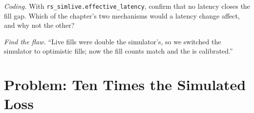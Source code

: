 \begin{exercise}[$\star\star\star$]\label{exo:rs:simulation-versus-live:7}
\emph{Coding.} With \texttt{rs\_simlive.effective\_latency}, confirm that no latency closes the fill gap. Which of the chapter's two mechanisms would a latency change
affect, and why not the other?
\end{exercise}

\begin{exercise}[$\star\star\star$]\label{exo:rs:simulation-versus-live:8}
\emph{Find the flaw.} ``Live fills were double the simulator's, so we switched the simulator to optimistic fills; now the fill counts match and the  is
calibrated.''
\end{exercise}

\section{Problem: Ten Times the Simulated Loss}

